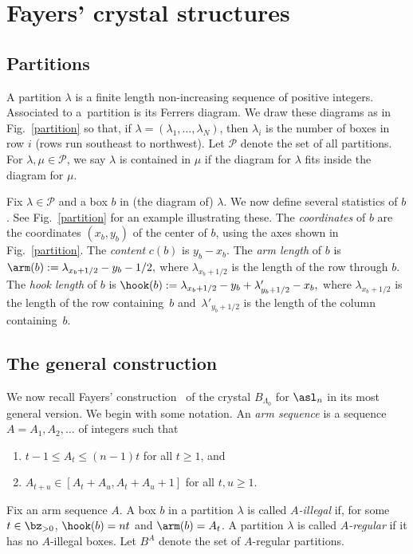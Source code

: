 \section{Fayers' crystal structures} \label{Fayers-section}

\subsection{Partitions} \label{Partitions}

A partition $\lambda$ is a f\/inite length non-increasing sequence of positive integers. Associated to a~partition is its Ferrers diagram. We draw these diagrams as in Fig.~\ref{partition} so that,
if $\lambda = (\lambda_1,\ldots, \lambda_N)$, then $\lambda_i$ is the number of boxes in row $i$
(rows run southeast to northwest).  Let $\mathcal{P}$ denote the set of all partitions. For $\lambda, \mu \in \mathcal{P}$, we say $\lambda$ is contained in $\mu$ if the diagram
for $\lambda$ f\/its inside the diagram for $\mu$.

Fix $\lambda \in \mathcal{P}$ and a box $b$ in (the diagram of) $\lambda$. We now def\/ine several statistics of $b$. See Fig.~\ref{partition} for an example illustrating these. The \emph{coordinates} of $b$ are the coordinates $(x_b,y_b)$ of the center of $b$, using the axes shown in Fig.~\ref{partition}. The \emph{content} $c(b)$ is $y_b-x_b$. The \emph{arm length} of $b$ is
$\arm(b):= \lambda_{x_b+1/2}-y_b-1/2,$
where $\lambda_{x_b+1/2}$ is the length of the row through $b$. The \emph{hook length} of $b$ is
$\hook(b):= \lambda_{x_b+1/2}-{y_b}+\lambda'_{y_b+1/2}-{x_b},$
where $\lambda_{x_b+1/2}$ is the length of the row containing~$b$ and~$\lambda'_{y_b+1/2}$ is the length of the column containing~$b$.

\subsection{The general construction} \label{pc-section}

We now recall Fayers' construction~\cite{Fayers:2009} of the crystal $B_{\Lambda_0}$ for $\asl_n$ in its most general version. We begin with some notation. An \emph{arm sequence} is a sequence $A=A_1,A_2, \ldots$ of integers such that
\begin{enumerate}\itemsep=0pt
\item $t-1 \leq A_t \leq (n-1) t$ for all $t \geq 1$, and

\item $A_{t+u} \in [A_t+A_u, A_t+A_u+1]$ for all $t,u \geq 1$.
\end{enumerate}
Fix an arm sequence $A$. A box $b$ in a partition $\lambda$ is called \emph{$A$-illegal} if, for some $t \in \bz_{>0}$, $\hook(b)=nt$ and $\arm(b)=A_t$. A partition $\lambda$ is called \emph{$A$-regular} if it has no $A$-illegal boxes. Let $B^A$ denote the set of $A$-regular partitions.

